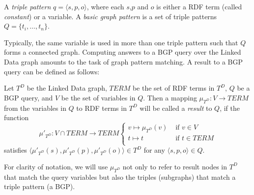 \begin{definition}
  A \emph{triple pattern} $q=\langle s,p,o \rangle$, where each $s$,$p$ and $o$ is either a RDF term (called \emph{constant}) or a variable. A \emph{basic graph pattern} is a set of triple patterns $Q= \{t_i,\ldots,t_n\}$. 
\end{definition}

Typically, the same variable is used in more than one triple pattern such that $Q$ forms a connected graph. Computing answers to a BGP query over the Linked Data graph amounts to the
task of graph pattern matching. A result to a BGP query can be defined as
follows:

\begin{definition}[Result]
Let $T^D$ be the Linked Data graph, $TERM$ be the set of RDF terms in $T^D$, $Q$ be a BGP query, and $V$ be the set of variables in $Q$. Then a mapping
$\mu_{T^D}: V \to TERM$ from the variables in $Q$ to RDF terms
in $T^D$ will be called a \emph{result} to $Q$, if the function
\[
\mu'_{T^D}: V \cap TERM \to TERM \left\{
\begin{array}{ll}
v \mapsto \mu_{T^D}(v) & \mbox{ if } v\in V \\
t \mapsto t & \mbox{ if } t \in TERM\\
\end{array}\right.
\]
satisfies $\langle \mu'_{T^D}(s),\mu'_{T^D}(p), \mu'_{T^D}(o) \rangle \in T^D$ for any $\langle s,p,o \rangle \in Q$. 
\end{definition}

For clarity of notation, we will use $\mu_{T^D}$ not only to refer to result nodes in ${T^D}$ that match the query variables but also the triples (subgraphs) that match a triple pattern (a BGP). 


